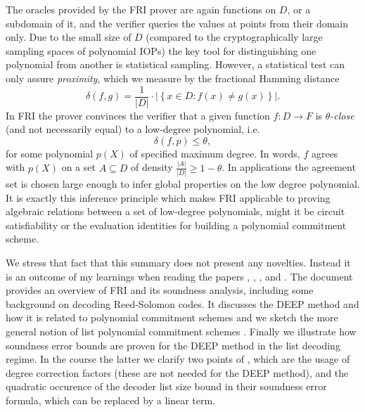 \documentclass[11pt,article,oneside]{memoir}
\theoremstyle{definition}
\theoremstyle{remark}
\begin{document}
The oracles provided by the FRI prover are again functions on $D$, or a subdomain of it, and the verifier queries the values at points from their domain only.
Due to the small size of $D$ (compared to the cryptographically large sampling spaces of polynomial IOPs) the key tool for distinguishing one  polynomial from another is statistical sampling. 
However, a statistical test can only assure \textit{proximity}, which we measure by the fractional Hamming distance
\begin{equation*}
\delta(f, g) = \frac{1}{|D|}\cdot \big|\left\{x\in D: f(x)\neq g(x)\right\}\big|.
\end{equation*}
In FRI the prover convinces the verifier that a given function $f: D\longrightarrow F$ is \textit{$\theta$-close} (and not necessarily equal) to a low-degree polynomial, i.e.
\begin{equation*}
\delta(f, p) \leq \theta,
\end{equation*}
for some polynomial $p(X)$ of specified maximum degree.
In words, $f$ agrees with $p(X)$ on a set $A\subseteq D$ of density $\frac{|A|}{|D|} \geq 1-\theta$. 
In applications the agreement set is chosen large enough to infer global properties on the low degree polynomial. 
It is exactly this inference principle which makes FRI applicable to proving algebraic relations between a set of low-degree polynomials, might it be circuit satisfiability or the evaluation identities for building a polynomial commitment scheme.


We stress that fact that this summary does not present any novelties.
Instead it is an outcome of my learnings when reading the papers \cite{ProximityGaps}, \cite{DEEPFRI}, \cite{FRI}, \cite{Redshift} and \cite{ethSTARK}. 
The document provides an overview of FRI and its soundness analysis, including some background on decoding Reed-Solomon codes.
It discusses the DEEP method and how it is related to polynomial commitment schemes and we sketch the more general notion of list polynomial commitment schemes \cite{Redshift}. 
Finally we illustrate how soundness error bounds are proven for the DEEP method in the list decoding regime. 
In the course the latter we clarify two points of \cite{ethSTARK}, which are the usage of degree correction factors (these are not needed for the DEEP method), and the quadratic occurence of the decoder list size bound in their soundness error formula, which can be replaced by a linear term.   
\end{document}
